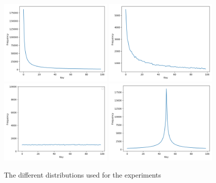 \begin{figure}[!htb]
  \centering
  \includegraphics[width=0.49\textwidth,height=\textheight,keepaspectratio]{img/skew-alpha1.png}
  \includegraphics[width=0.49\textwidth,height=\textheight,keepaspectratio]{img/skew-alpha05.png}
  \includegraphics[width=0.49\textwidth,height=\textheight,keepaspectratio]{img/skew-alpha0.png}
  \includegraphics[width=0.49\textwidth,height=\textheight,keepaspectratio]{img/skew-alpha1smooth.png}
  \caption{ The different distributions used for the experiments}
  \label{fig:skews}
\end{figure}

